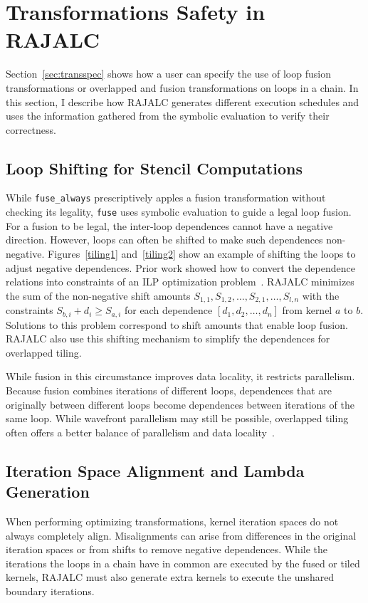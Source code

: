 \section{Transformations Safety in RAJALC}
Section~\ref{sec:transspec} shows how a user can specify the use of loop fusion transformations
or overlapped and fusion transformations on loops in a chain.
In this section, I describe 
how RAJALC generates different execution schedules and uses the information gathered from the symbolic evaluation to verify their correctness.

\subsection{Loop Shifting for Stencil Computations}

While \verb.fuse_always. prescriptively apples a fusion transformation
without checking its legality, \verb.fuse. uses symbolic evaluation to
guide a legal loop fusion.
For a fusion to be legal, the inter-loop dependences cannot have a
negative direction.
However, loops can often be shifted to make such
dependences non-negative.
Figures~\ref{tiling1} and~\ref{tiling2} show an example of shifting the
loops to adjust negative dependences.
Prior work showed how to convert the dependence relations into constraints
of an ILP optimization problem~\cite{bertolacci2019using}.
RAJALC minimizes the sum of the non-negative shift amounts
$S_{1,1},S_{1,2},\ldots,S_{2,1},\ldots,S_{l,n}$ with the constraints $S_{b,i} + d_i \geq S_{a,i}$ for each dependence
$[d_1,d_2,\ldots,d_n]$ from kernel $a$ to $b$.
Solutions to this problem correspond to shift amounts that enable loop fusion.
RAJALC also use this shifting mechanism to simplify the dependences for overlapped
tiling.

While fusion in this circumstance improves data locality, it restricts
parallelism.
Because fusion combines iterations of different loops, dependences that
are originally between different loops become dependences between iterations
of the same loop. 
While wavefront parallelism may still be possible, overlapped tiling often
offers a better balance of parallelism and data locality~\cite{CathieSC14}.

\subsection{Iteration Space Alignment and Lambda Generation}
When performing optimizing transformations, kernel iteration spaces do not
always completely align. 
Misalignments can arise from differences in the original iteration spaces
or from shifts to remove negative dependences. 
While the iterations the loops in a chain have in common are executed by
the fused or tiled kernels, RAJALC must also generate extra kernels to execute
the unshared boundary iterations.

